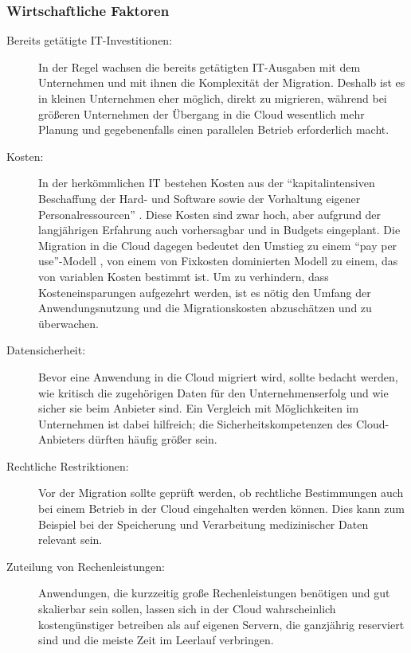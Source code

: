 \subsubsection{Wirtschaftliche Faktoren}
\begin{description}
	\item[Bereits getätigte IT-Investitionen:]
	In der Regel wachsen die bereits getätigten IT-Ausgaben mit dem
Unternehmen und mit ihnen die Komplexität der Migration. Deshalb ist es in
kleinen Unternehmen eher möglich, direkt zu migrieren, während bei
größeren Unternehmen der Übergang in die Cloud wesentlich mehr Planung und
gegebenenfalls einen parallelen Betrieb erforderlich macht.

	\item[Kosten:] In der herkömmlichen IT bestehen Kosten aus der
"`kapitalintensiven Beschaffung der Hard- und Software sowie der Vorhaltung
eigener Personalressourcen"' . Diese Kosten sind
zwar hoch, aber aufgrund der langjährigen Erfahrung auch vorhersagbar und in
Budgets eingeplant. Die Migration in die Cloud dagegen bedeutet den Umstieg zu
einem "`pay per use"'-Modell , von einem
von Fixkosten dominierten Modell zu einem, das von variablen Kosten bestimmt
ist.
Um zu verhindern, dass Kosteneinsparungen aufgezehrt werden, ist es nötig
den Umfang der Anwendungsnutzung und die Migrationskosten abzuschätzen und zu 
überwachen.


	\item[Datensicherheit:] Bevor eine Anwendung in die Cloud migriert
wird, sollte bedacht werden, wie kritisch die zugehörigen Daten für den
Unternehmenserfolg und wie sicher sie beim Anbieter sind. Ein Vergleich mit 
Möglichkeiten im Unternehmen ist dabei hilfreich; die Sicherheitskompetenzen 
des Cloud-Anbieters dürften häufig größer sein.
	\item[Rechtliche Restriktionen:] Vor der Migration sollte geprüft
werden, ob rechtliche Bestimmungen auch bei einem Betrieb in der Cloud
eingehalten werden können. Dies kann zum Beispiel bei der Speicherung und 
Verarbeitung medizinischer Daten relevant sein.
	\item[Zuteilung von Rechenleistungen:] Anwendungen, die kurzzeitig
große Rechenleistungen benötigen und gut skalierbar sein sollen, lassen sich in
der Cloud wahrscheinlich kostengünstiger betreiben als auf eigenen Servern, die
ganzjährig reserviert sind und die meiste Zeit im Leerlauf verbringen.
\end{description}


